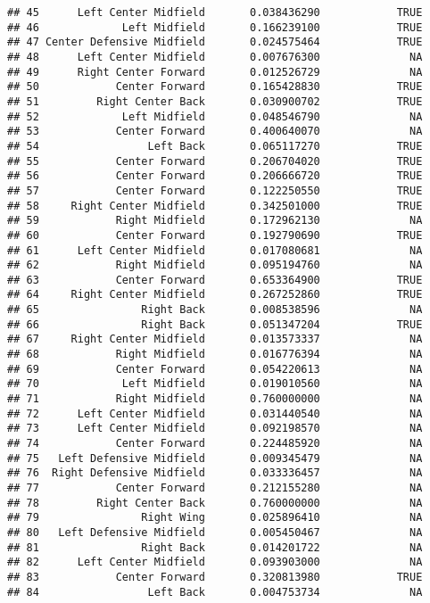 \documentclass[]{article}
\begin{document}
\begin{verbatim}
## 45      Left Center Midfield       0.038436290            TRUE
## 46             Left Midfield       0.166239100            TRUE
## 47 Center Defensive Midfield       0.024575464            TRUE
## 48      Left Center Midfield       0.007676300              NA
## 49      Right Center Forward       0.012526729              NA
## 50            Center Forward       0.165428830            TRUE
## 51         Right Center Back       0.030900702            TRUE
## 52             Left Midfield       0.048546790              NA
## 53            Center Forward       0.400640070              NA
## 54                 Left Back       0.065117270            TRUE
## 55            Center Forward       0.206704020            TRUE
## 56            Center Forward       0.206666720            TRUE
## 57            Center Forward       0.122250550            TRUE
## 58     Right Center Midfield       0.342501000            TRUE
## 59            Right Midfield       0.172962130              NA
## 60            Center Forward       0.192790690            TRUE
## 61      Left Center Midfield       0.017080681              NA
## 62            Right Midfield       0.095194760              NA
## 63            Center Forward       0.653364900            TRUE
## 64     Right Center Midfield       0.267252860            TRUE
## 65                Right Back       0.008538596              NA
## 66                Right Back       0.051347204            TRUE
## 67     Right Center Midfield       0.013573337              NA
## 68            Right Midfield       0.016776394              NA
## 69            Center Forward       0.054220613              NA
## 70             Left Midfield       0.019010560              NA
## 71            Right Midfield       0.760000000              NA
## 72      Left Center Midfield       0.031440540              NA
## 73      Left Center Midfield       0.092198570              NA
## 74            Center Forward       0.224485920              NA
## 75   Left Defensive Midfield       0.009345479              NA
## 76  Right Defensive Midfield       0.033336457              NA
## 77            Center Forward       0.212155280              NA
## 78         Right Center Back       0.760000000              NA
## 79                Right Wing       0.025896410              NA
## 80   Left Defensive Midfield       0.005450467              NA
## 81                Right Back       0.014201722              NA
## 82      Left Center Midfield       0.093903000              NA
## 83            Center Forward       0.320813980            TRUE
## 84                 Left Back       0.004753734              NA

\end{verbatim}
\end{document}
